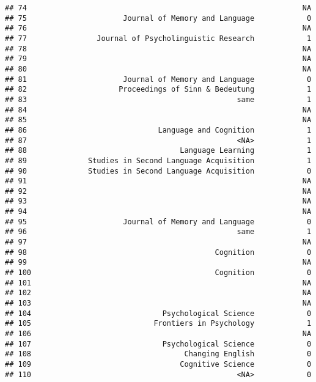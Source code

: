 \documentclass[
  english,
  man]{apa6}
\begin{document}
\begin{verbatim}
## 74                                                               NA
## 75                      Journal of Memory and Language            0
## 76                                                               NA
## 77                Journal of Psycholinguistic Research            1
## 78                                                               NA
## 79                                                               NA
## 80                                                               NA
## 81                      Journal of Memory and Language            0
## 82                     Proceedings of Sinn & Bedeutung            1
## 83                                                same            1
## 84                                                               NA
## 85                                                               NA
## 86                              Language and Cognition            1
## 87                                                <NA>            1
## 88                                   Language Learning            1
## 89              Studies in Second Language Acquisition            1
## 90              Studies in Second Language Acquisition            0
## 91                                                               NA
## 92                                                               NA
## 93                                                               NA
## 94                                                               NA
## 95                      Journal of Memory and Language            0
## 96                                                same            1
## 97                                                               NA
## 98                                           Cognition            0
## 99                                                               NA
## 100                                          Cognition            0
## 101                                                              NA
## 102                                                              NA
## 103                                                              NA
## 104                              Psychological Science            0
## 105                            Frontiers in Psychology            1
## 106                                                              NA
## 107                              Psychological Science            0
## 108                                   Changing English            0
## 109                                  Cognitive Science            0
## 110                                               <NA>            0

\end{verbatim}
\end{document}
